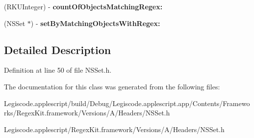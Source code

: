 \begin{DoxyCompactItemize}
\item 
\hypertarget{interface_n_s_set_07_regex_kit_additions_08_a56f47b1db7afab9d9036eb9788111fa5}{(R\-K\-U\-Integer) -\/ {\bfseries count\-Of\-Objects\-Matching\-Regex\-:}}\label{interface_n_s_set_07_regex_kit_additions_08_a56f47b1db7afab9d9036eb9788111fa5}

\item 
\hypertarget{interface_n_s_set_07_regex_kit_additions_08_aefe34f81e6ff55ec40c1b8ecab4fdc20}{(N\-S\-Set $\ast$) -\/ {\bfseries set\-By\-Matching\-Objects\-With\-Regex\-:}}\label{interface_n_s_set_07_regex_kit_additions_08_aefe34f81e6ff55ec40c1b8ecab4fdc20}

\end{DoxyCompactItemize}


\subsection{Detailed Description}


Definition at line 50 of file N\-S\-Set.\-h.



The documentation for this class was generated from the following files\-:\begin{DoxyCompactItemize}
\item 
Legiscode.\-applescript/build/\-Debug/\-Legiscode.\-applescript.\-app/\-Contents/\-Frameworks/\-Regex\-Kit.\-framework/\-Versions/\-A/\-Headers/N\-S\-Set.\-h\item 
Legiscode.\-applescript/\-Regex\-Kit.\-framework/\-Versions/\-A/\-Headers/N\-S\-Set.\-h\end{DoxyCompactItemize}
